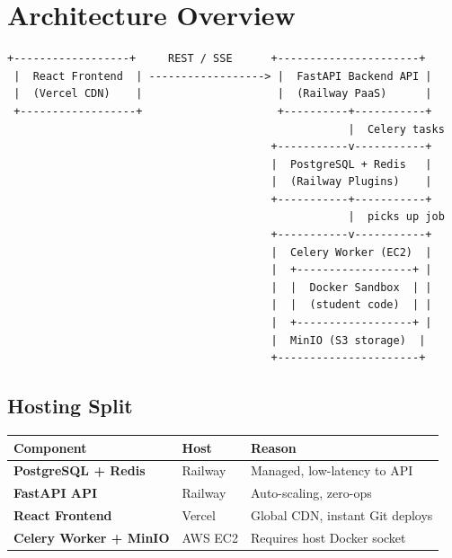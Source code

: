 \documentclass[12pt,a4paper]{article}
\begin{document}
\tableofcontents
\newpage

\section{Architecture Overview}

\begin{lstlisting}[style=terminal]
 +------------------+     REST / SSE      +----------------------+
 |  React Frontend  | ------------------> |  FastAPI Backend API |
 |  (Vercel CDN)    |                     |  (Railway PaaS)      |
 +------------------+                     +----------+-----------+
                                                     |  Celery tasks
                                         +-----------v-----------+
                                         |  PostgreSQL + Redis   |
                                         |  (Railway Plugins)    |
                                         +-----------+-----------+
                                                     |  picks up job
                                         +-----------v-----------+
                                         |  Celery Worker (EC2)  |
                                         |  +------------------+ |
                                         |  |  Docker Sandbox  | |
                                         |  |  (student code)  | |
                                         |  +------------------+ |
                                         |  MinIO (S3 storage)  |
                                         +----------------------+
\end{lstlisting}

\subsection{Hosting Split}

\begin{center}
\begin{tabularx}{\linewidth}{>{\bfseries}llX}
\toprule
Component & Host & Reason \\
\midrule
PostgreSQL + Redis & Railway & Managed, low-latency to API \\
FastAPI API        & Railway & Auto-scaling, zero-ops \\
React Frontend     & Vercel  & Global CDN, instant Git deploys \\
Celery Worker + MinIO & AWS EC2 & Requires host Docker socket \\
\bottomrule
\end{tabularx}
\end{center}
\end{document}
